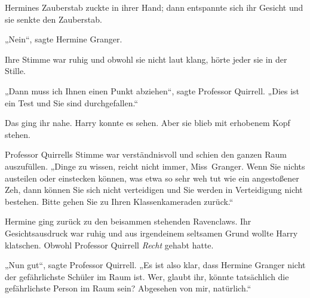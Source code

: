 Hermines Zauberstab zuckte in ihrer Hand; dann entspannte sich ihr Gesicht und sie senkte den Zauberstab.

„Nein“, sagte Hermine Granger.

Ihre Stimme war ruhig und obwohl sie nicht laut klang, hörte jeder sie in der Stille.

„Dann muss ich Ihnen einen Punkt abziehen“, sagte Professor Quirrell. „Dies ist ein Test und Sie sind durchgefallen.“

Das ging ihr nahe. Harry konnte es sehen. Aber sie blieb mit erhobenem Kopf stehen.

Professor Quirrells Stimme war verständnisvoll und schien den ganzen Raum auszufüllen. „Dinge zu wissen, reicht nicht immer, Miss~Granger. Wenn Sie nichts austeilen oder einstecken können, was etwa so sehr weh tut wie ein angestoßener Zeh, dann können Sie sich nicht verteidigen und Sie werden in Verteidigung nicht bestehen. Bitte gehen Sie zu Ihren Klassenkameraden zurück.“

Hermine ging zurück zu den beisammen stehenden Ravenclaws. Ihr Gesichtsausdruck war ruhig und aus irgendeinem seltsamen Grund wollte Harry klatschen. Obwohl Professor Quirrell \emph{Recht} gehabt hatte.

„Nun gut“, sagte Professor Quirrell. „Es ist also klar, dass Hermine Granger nicht der gefährlichste Schüler im Raum ist. Wer, glaubt ihr, könnte tatsächlich die gefährlichste Person im Raum sein? Abgesehen von mir, natürlich.“

